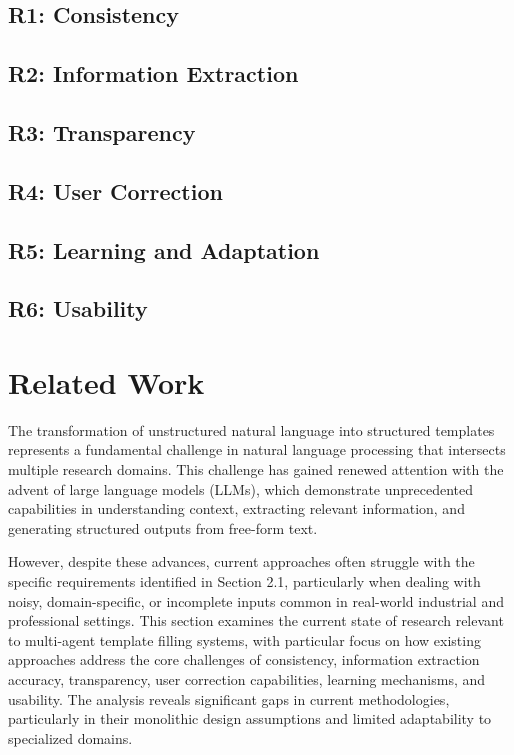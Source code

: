 \subsection{R1: Consistency}
 

\subsection{R2: Information Extraction}
 

\subsection{R3: Transparency}
 

\subsection{R4: User Correction}


\subsection{R5: Learning and Adaptation}


\subsection{R6: Usability}



\section{Related Work}

The transformation of unstructured natural language into structured templates represents a fundamental challenge in natural language processing that intersects multiple research domains. This challenge has gained renewed attention with the advent of large language models (LLMs), which demonstrate unprecedented capabilities in understanding context, extracting relevant information, and generating structured outputs from free-form text. 

However, despite these advances, current approaches often struggle with the specific requirements identified in Section 2.1, particularly when dealing with noisy, domain-specific, or incomplete inputs common in real-world industrial and professional settings.
This section examines the current state of research relevant to multi-agent template filling systems, with particular focus on how existing approaches address the core challenges of consistency, information extraction accuracy, transparency, user correction capabilities, learning mechanisms, and usability. The analysis reveals significant gaps in current methodologies, particularly in their monolithic design assumptions and limited adaptability to specialized domains.


